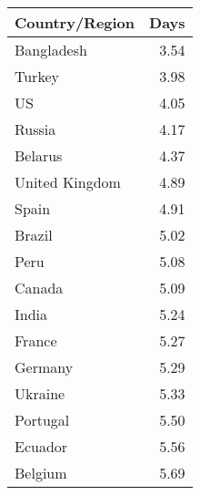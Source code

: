 \begin{tabular}{lr}
\toprule
 Country/Region &  Days \\
\midrule
     Bangladesh &  3.54 \\
         Turkey &  3.98 \\
             US &  4.05 \\
         Russia &  4.17 \\
        Belarus &  4.37 \\
 United Kingdom &  4.89 \\
          Spain &  4.91 \\
         Brazil &  5.02 \\
           Peru &  5.08 \\
         Canada &  5.09 \\
          India &  5.24 \\
         France &  5.27 \\
        Germany &  5.29 \\
        Ukraine &  5.33 \\
       Portugal &  5.50 \\
        Ecuador &  5.56 \\
        Belgium &  5.69 \\
\bottomrule
\end{tabular}
